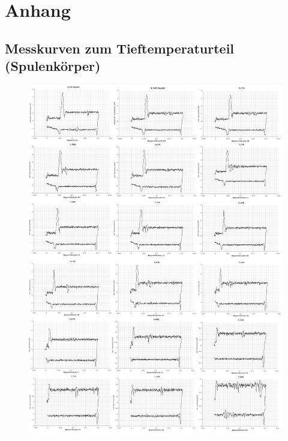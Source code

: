 \chapter{Anhang}
\section{Messkurven zum Tieftemperaturteil (Spulenkörper)}
\begin{figure}[H]
	\begin{center}
		\includegraphics[width=12cm]{graphen_spule.png}
	\end{center}
\end{figure}

